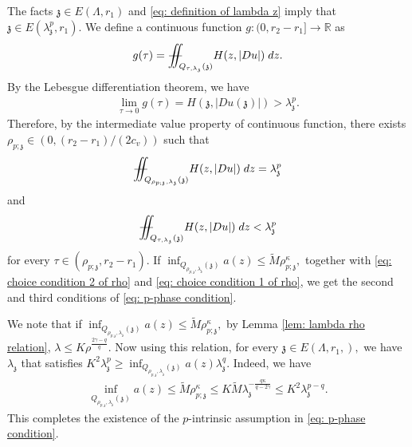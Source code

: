 \documentclass[notitlepage,11pt,reqno]{amsart}
\theoremstyle{definition}
\numberwithin{equation}{section}
\newcommand{\iintss}{{\int\hspace{-0.28cm}\int}}
\newcommand{ \miints }{{\iintss\hspace{-0.56cm} -\hspace{-0.15cm}-}}
\newcommand{\miint}[1]{{\miints_{\hspace{-0.13cm}#1}}}
\begin{document}
The facts $\mathfrak{z}\in E(\Lambda,r_1)$ and \eqref{eq: definition of lambda z} imply that $\mathfrak{z}\in E(\lambda_\mathfrak{z}^p,r_1)$. We define a continuous function $g: (0, r_2-r_1]\to \mathbb{R}$ as
\begin{align*}
  g (\tau)=  \miint{Q_{\tau,\lambda_\mathfrak{z}}(\mathfrak{z})} H(z,|Du|)\; dz.
\end{align*}
By the Lebesgue differentiation theorem, we have 
\begin{align*}
    \lim_{\tau \to 0}g(\tau)=H(\mathfrak z, |Du(\mathfrak z)|)>\lambda^p_{\mathfrak z}.
\end{align*}
Therefore, by the intermediate value property of continuous function, there exists $\rho_{p;\mathfrak{z}}\in (0,(r_2-r_1)/(2c_v))$ such that 
\begin{equation}    \label{eq: choice condition 1 of rho}
    \miint{Q_{\rho_{p;\mathfrak{z}},\lambda_\mathfrak{z}}(\mathfrak{z})} H(z,|Du|)\; dz=\lambda_\mathfrak{z}^p
\end{equation}
and
\begin{equation}    \label{eq: choice condition 2 of rho}
    \miint{Q_{\tau,\lambda_\mathfrak{z}}(\mathfrak{z})} H(z,|Du|)\; dz< \lambda_\mathfrak{z}^p
\end{equation}
for every $\tau\in(\rho_{p;\mathfrak{z}},r_2-r_1)$. If $\inf_{Q_{\rho_{p; \mathfrak z}, \lambda_{\mathfrak z}}(\mathfrak z)}a(z)\leq\widetilde M\rho^{\kappa}_{p; \mathfrak z},$ together with \eqref{eq: choice condition 2 of rho} and \eqref{eq: choice condition 1 of rho}, we get the second and third conditions of \eqref{eq: p-phase condition}. 

We note that if $\inf_{Q_{\rho_{p; \mathfrak z}, \lambda_{\mathfrak z}}(\mathfrak z)}a( z)\leq \widetilde M\rho^{\kappa}_{p; \mathfrak z},$ by Lemma \ref{lem: lambda rho relation}, $\lambda\leq K \rho^{\frac{2\gamma -q}{q}}.$ Now using this relation, for every $\mathfrak z \in E(\Lambda, r_1,),$ we have $\lambda_{\mathfrak z}$ that satisfies $K^2\lambda^p_{\mathfrak z}\geq \inf_{Q_{\rho_{p; \mathfrak z}, \lambda_{\mathfrak z}}(\mathfrak z)}a( z)\lambda^q_{\mathfrak z}.$ Indeed, we have
\begin{align*}
 \inf_{Q_{\rho_{p; \mathfrak z}, \lambda_{\mathfrak z}}(\mathfrak z)}a( z)\leq \widetilde M\rho^{\kappa}_{p; \mathfrak z}\leq K\widetilde M \lambda^{-\frac{q\kappa}{q-2\gamma}}_{\mathfrak z} \leq K^2 \lambda^{p-q}_{\mathfrak z}.
\end{align*}
This completes the existence of the $p$-intrinsic assumption in \eqref{eq: p-phase condition}.
\end{document}
